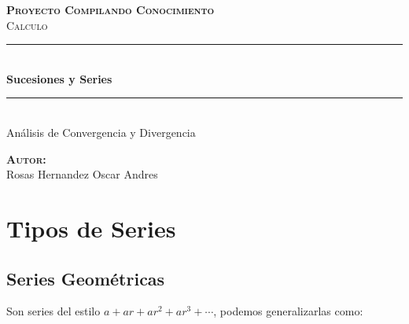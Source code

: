 \documentclass[12pt]{report}                                %
\author{Oscar Andrés Rosas}                                 %
\begin{document}
\begin{titlepage}

    \center
    \textbf{\textsc{\Large Proyecto Compilando Conocimiento}}\\[1.0cm] 
    \textsc{\Large Calculo}\\[1.0cm] 

    \rule{\linewidth}{0.5mm} \\[1.0cm]
        { \huge \bfseries Sucesiones y Series}\\[1.0cm] 
    \rule{\linewidth}{0.5mm} \\[2.0cm]
    
    {\LARGE Análisis de Convergencia y Divergencia}\\[7cm] 
    
    \begin{center} \large
    \textbf{\textsc{Autor:}}\\
    Rosas Hernandez Oscar Andres
    \end{center}

    \vfill

\end{titlepage}

\tableofcontents{}
\clearpage

\chapter{Tipos de Series}
    \clearpage

    \section{Series Geométricas}
        Son series del estilo $a + ar + ar^2 + ar^3 + \cdots$, podemos
        generalizarlas como:
\end{document}
